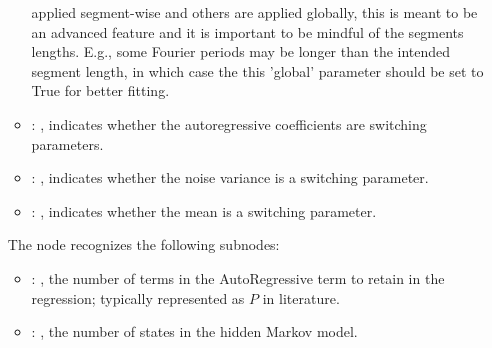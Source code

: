 \begin{itemize}
\begin{itemize}
            applied segment-wise and others are applied globally, this is meant to be an
            advanced feature and it is important to be mindful of the segments lengths.
            E.g., some Fourier periods may be longer than the intended segment length, in
            which case the this 'global' parameter should be set to True for better
            fitting. 
          \item {}: ,
            indicates whether the autoregressive coefficients are switching parameters. 
          \item {}: ,
            indicates whether the noise variance is a switching parameter. 
          \item {}: ,
            indicates whether the mean is a switching parameter. 
      \end{itemize}

      The  node recognizes the following subnodes:
      \begin{itemize}
        \item {}: ,
          the number of terms in the AutoRegressive term to retain in the
          regression; typically represented as $P$ in literature.

        \item {}: ,
          the number of states in the hidden Markov model.
      \end{itemize}


\end{itemize}
